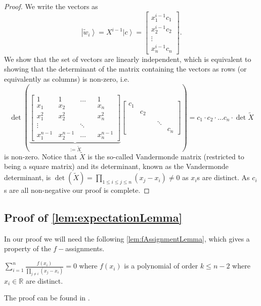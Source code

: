 \documentclass{theoretics}
\begin{document}
\begin{proof}
	We write the vectors as 
	\begin{displaymath}
	\left|\tilde{w}_{i}\right\rangle =X^{i-1}\left|c\right\rangle =\left[\begin{array}{c}
	x_{1}^{i-1}c_{1}\\
	x_{2}^{i-1}c_{2}\\
	\vdots\\
	x_{n}^{i-1}c_{n}
	\end{array}\right].
	\end{displaymath}
	We show that the set of vectors are linearly independent, which is
	equivalent to showing that the determinant of the matrix containing
	the vectors as rows (or equivalently as columns) is non-zero, i.e.
	\begin{displaymath}
	\det\left(\underbrace{\left[\begin{array}{ccccc}
		1 & 1 & \dots &  & 1\\
		x_{1} & x_{2} &  &  & x_{n}\\
		x_{1}^{2} & x_{2}^{2} &  &  & x_{n}^{2}\\
		\vdots &  & \ddots\\
		x_{1}^{n-1} & x_{2}^{n-1} & \dots &  & x_{n}^{n-1}
		\end{array}\right]}_{:=\tilde{X}}\left[\begin{array}{ccccc}
	c_{1}\\
	& c_{2}\\
	\\
	&  &  & \ddots\\
	&  &  &  & c_{n}
	\end{array}\right]\right)=c_{1}\cdot c_{2}\cdot\dots c_{n}\cdot\det\tilde{X}
	\end{displaymath}
	is non-zero. Notice that $\tilde{X}$ is the so-called
	Vandermonde matrix (restricted to being a square matrix) and its determinant,
	known as the Vandermonde determinant, is $\det(\tilde{X})=\prod_{1\le i\le j\le n}(x_{j}-x_{i})\neq0$
	as $x_{i}$s are distinct. As $c_{i}$s are all non-negative our
	proof is complete.
\end{proof}
\subsection{Proof of \ref{lem:expectationLemma}}\label{subsec:proofexpectationlemma}
In our proof we will need the following \ref{lem:fAssignmentLemma}, which gives a property of the $f-$assignments. 
\begin{lemma}
	\label{lem:fAssignmentLemma} $\sum_{i=1}^{n}\frac{f(x_{i})}{\prod_{j\neq i}(x_{j}-x_{i})}=0$
	where $f(x_{i})$ is a polynomial of order $k\le n-2$ where $x_{i}\in\mathbb{R}$
	are distinct.
\end{lemma}
The proof can be found in \cite{Mochon07,ACG+14}. 
\end{document}
